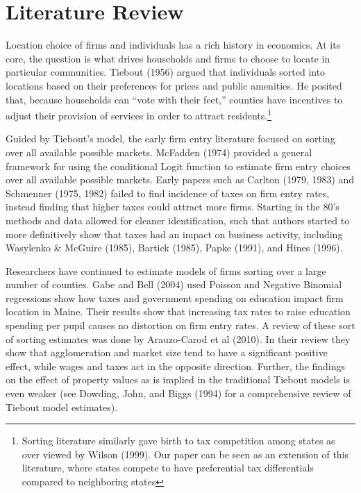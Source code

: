 \documentclass[12pt,a4paper]{article}
\begin{document}
\section{Literature Review}

Location choice of firms and individuals has a rich history in economics. At its core, the question is what drives households and firms to choose to locate in particular communities. Tiebout (1956) argued that individuals sorted into locations based on their preferences for prices and public amenities. He posited that, because households can “vote with their feet,” counties have incentives to adjust their provision of services in order to attract residents.\footnote{Sorting literature similarly gave birth to tax competition among states as over viewed by Wilson (1999). Our paper can be seen as an extension of this literature, where states compete to have preferential tax differentials compared to neighboring states}

Guided by Tiebout’s model, the early firm entry literature focused on sorting over all available possible markets.  McFadden (1974) provided a general framework for using the conditional Logit function to estimate firm entry choices over all available possible markets. Early papers such as Carlton (1979, 1983) and Schmenner (1975, 1982) failed to find incidence of taxes on firm entry rates, instead finding that higher taxes could attract more firms. Starting in the 80's methods and data allowed for cleaner identification, such that authors started to more definitively show that taxes had an impact on business activity, including Wasylenko \& McGuire (1985), Bartick (1985), Papke (1991), and Hines (1996).

Researchers have continued to estimate models of firms sorting over a large number of counties. Gabe and Bell (2004) used Poisson and Negative Binomial regressions show how taxes and government spending on education impact firm location in Maine. Their results show that increasing tax rates to raise education spending per pupil causes no distortion on firm entry rates. A review of these sort of sorting estimates was done by Arauzo-Carod et al (2010). In their review they show that agglomeration and market size tend to have a significant positive effect, while wages and taxes act in the opposite direction. Further, the findings on the effect of property values as is implied in the traditional Tiebout models is even weaker (see Dowding, John, and Biggs (1994) for a comprehensive review of Tiebout model estimates).
\end{document}
